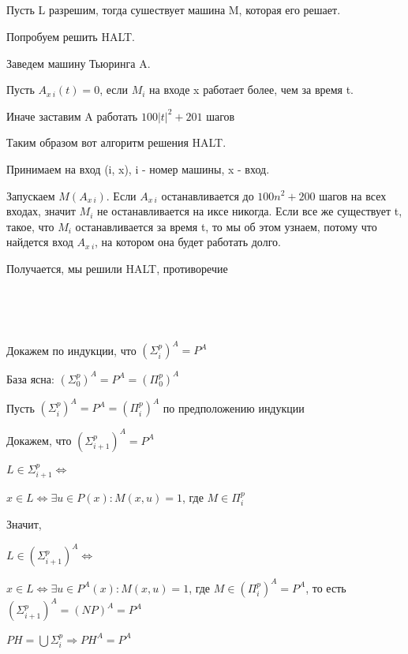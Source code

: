 ~\

~\


\begin{problem}{4}


\end{problem}

~\

~\

\begin{solution}

Пусть L разрешим, тогда сушествует машина M, которая его решает.

Попробуем решить HALT.

Заведем машину Тьюринга A.

Пусть $A_{x \: i}(t) = 0$, если $M_i$ на входе x работает более, чем за время t.

Иначе заставим A работать $100|t|^2 + 201$ шагов

Таким образом вот алгоритм решения HALT.

Принимаем на вход (i, x), i - номер машины, x - вход.

Запускаем $M(A_{x \: i})$. Если $A_{x \: i}$ останавливается до $100n^2 + 200$ шагов на всех входах, значит $M_i$ не останавливается на иксе никогда. Если все же существует t, такое, что $M_i$ останавливается за время t, то мы об этом узнаем, потому что найдется вход $A_{x \: i}$, на котором она будет работать долго.

Получается, мы решили HALT, противоречие

\end{solution}

~\

~\

\begin{problem}{5}

\end{problem}



\begin{solution}

Докажем по индукции, что $(\Sigma_i^p)^A = P^A$

База ясна: $(\Sigma_0^p)^A = P^A = (\Pi_0^p)^A$

Пусть $(\Sigma_i^p)^A = P^A = (\Pi_i^p)^A$ по предположению индукции

Докажем, что $(\Sigma_{i + 1}^p)^A = P^A$

$L \in \Sigma_{i + 1}^p \Leftrightarrow$

$x \in L \Leftrightarrow \exists u \in P(x) : M(x, u) = 1 $, где $M \in \Pi_i^p$

Значит,

$L \in (\Sigma_{i + 1}^p)^A \Leftrightarrow$

$x \in L \Leftrightarrow \exists u \in P^A(x) : M(x, u) = 1 $, где $M \in (\Pi_i^p)^A = P^A$, то есть $(\Sigma_{i + 1}^p)^A = (NP)^A = P^A$

$PH = \bigcup{\Sigma_i^p} \Rightarrow PH^A = P^A$


\end{solution}





